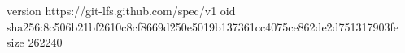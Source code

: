 version https://git-lfs.github.com/spec/v1
oid sha256:8c506b21bf2610c8cf8669d250e5019b137361cc4075ce862de2d751317903fe
size 262240

